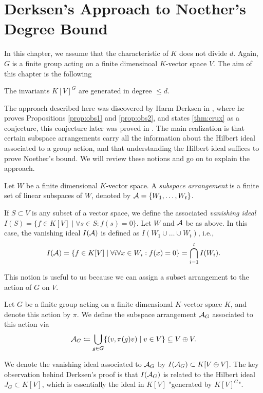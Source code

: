 \documentclass[../main.tex]{subfiles}
\begin{document}
\section{Derksen's Approach to Noether's Degree Bound}
In this chapter, we assume that the characteristic of $K$ does not divide $d$. 
Again, $G$ is a finite group acting on a finite dimensinoal $K$-vector space $V$.
The aim of this chapter is the following
\begin{thm}\label{thm:generalNoether}
    The invariants $K[V]^G$ are generated in degree $\leq d$.
\end{thm}

The approach described here was discovered by Harm Derksen in
\cite{DERKSENProofIdea}, where he proves Propositions \ref{prop:obs1} and 
\ref{prop:obs2}, and states \ref{thm:crux} as a conjecture, 
this conjecture later was proved in \cite{DERKSENRegularity}. 
The main realization is
that certain subspace arrangements carry all the information about the Hilbert ideal
associated to a group action, and that understanding the Hilbert ideal suffices to
prove Noether's bound. We will review these notions and go on to explain the 
approach.

\begin{defi}
    Let $W$ be a finite dimensional $K$-vector space. A \emph{subspace
    arrangement} is a finite set of linear subspaces of $W$, denoted by $\mathcal{A} =
    \{W_1, \dots, W_t\}$. 
\end{defi}

\begin{defi}
    If $S \subset V$ is any subset of a vector space, we define the associated
    \emph{vanishing ideal}
    $I(S) = \{f \in K[V] \mid \forall s \in S: f(s) = 0\}$.
    Let $W$ and $\mathcal{A}$ be as above. In this case, the vanishing ideal $I(\mathcal{A})$
    is defined as $I(W_1 \cup \dots \cup W_t)$, i.e.,
    \begin{equation*}
        I(\mathcal{A}) = \{f \in K[V] \mid \forall i \forall x \in W_i: f(x) = 0\} =
        \bigcap_{i=1}^t I(W_i).
    \end{equation*}
\end{defi}

This notion is useful to us because we can assign a subset arrangement to the
action of $G$ on $V$.
\begin{defi}
    Let $G$ be a finite group acting on a finite dimensional $K$-vector space $K$, 
    and denote this action by $\pi$.
    We define the subspace arrangement $\mathcal{A}_G$ associated to this action via
    \begin{equation*}
        \mathcal{A}_G \coloneqq \bigcup_{g \in G}\{(v,\pi(g)v) \mid v \in V\}
        \subseteq V \oplus V.
    \end{equation*}
\end{defi}
We denote the vanishing ideal associated to $\mathcal{A}_G$ by $I(\mathcal{A}_G) \subset K[V \oplus V]$. 
The key observation behind Derksen's proof is that $I(\mathcal{A}_G)$ is related to the Hilbert ideal
$J_G \subset K[V]$, which is essentially the ideal in $K[V]$ "generated by $K[V]^G$".
\end{document}
